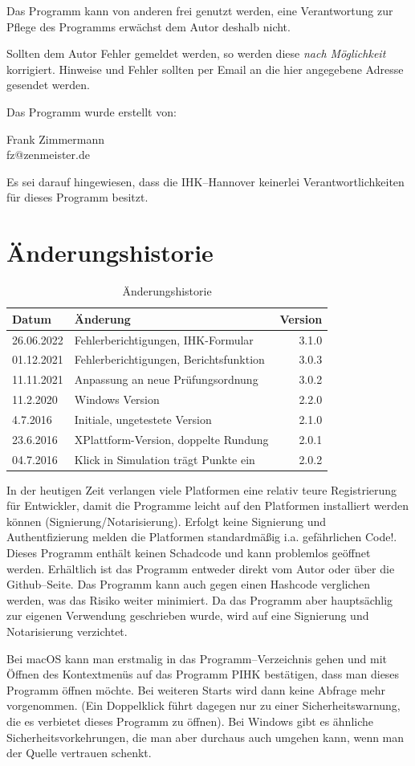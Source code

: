 \documentclass[a4paper,notitlepage,parskip=half]{scrartcl}
\begin{document}
Das Programm kann von anderen frei genutzt werden, eine Verantwortung zur Pflege des Programms erwächst dem Autor deshalb nicht.

Sollten dem Autor Fehler gemeldet werden, so werden diese \emph{nach Möglichkeit} korrigiert. Hinweise und Fehler sollten per Email an die hier angegebene Adresse gesendet werden.

Das Programm wurde erstellt von:

Frank Zimmermann\\
fz@zenmeister.de

Es sei darauf hingewiesen, dass die IHK--Hannover keinerlei Verantwortlichkeiten für dieses Programm besitzt.
\section{Änderungshistorie}
\begin{table}[H]\centering
\begin{tabular}{|l|l|r|}
\hline
Datum & Änderung &Version\\
\hline
26.06.2022& Fehlerberichtigungen, IHK-Formular  &  3.1.0\\
01.12.2021&   Fehlerberichtigungen, Berichtsfunktion  &  3.0.3\\
11.11.2021& Anpassung an neue Prüfungsordnung &  3.0.2\\
11.2.2020&	Windows Version						&  2.2.0\\
4.7.2016&	Initiale, ungetestete Version		&  2.1.0\\
23.6.2016&	XPlattform-Version, doppelte Rundung&  2.0.1\\
04.7.2016&	Klick in Simulation trägt Punkte ein&  2.0.2\\
\hline
\end{tabular}
\caption{Änderungshistorie}
\end{table}

\begin{marker}
In der heutigen Zeit verlangen viele Platformen eine relativ teure Registrierung für Entwickler, damit die Programme leicht auf den Platformen installiert werden können (Signierung/Notarisierung). Erfolgt keine Signierung und Authentfizierung melden die Platformen standardmäßig i.a. gefährlichen Code!. Dieses Programm enthält keinen Schadcode und kann problemlos geöffnet werden.
Erhältlich ist das Programm entweder direkt vom Autor oder über die Github--Seite.
Das Programm kann auch gegen einen Hashcode verglichen werden, was das Risiko weiter minimiert.
Da das Programm aber hauptsächlig zur eigenen Verwendung geschrieben wurde, wird auf eine Signierung und Notarisierung verzichtet.

Bei macOS kann man erstmalig in das Programm--Verzeichnis gehen und mit Öffnen des Kontextmenüs auf das Programm PIHK bestätigen, dass man dieses Programm öffnen möchte.
Bei weiteren Starts wird dann keine Abfrage mehr vorgenommen. (Ein Doppelklick führt dagegen nur zu einer Sicherheitswarnung, die es verbietet dieses Programm zu öffnen).
Bei Windows gibt es ähnliche Sicherheitsvorkehrungen, die man aber durchaus auch umgehen kann, wenn man der Quelle vertrauen schenkt.
\end{marker}
\end{document}
